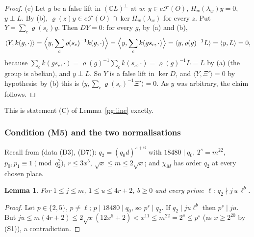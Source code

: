 \documentclass[10pt]{amsart}
\newtheorem{lemma}[theorem]{Lemma}
\theoremstyle{definition}
\theoremstyle{remark}
\newcommand{\C}{\mathbb C}
\begin{document}
\begin{proof}
(e) Let $y$ be a false lift in $(\C L)^\perp$ at $w$: $y\in e\mathcal F(O)$, $H_w(\lambda_w)y=0$,
$y\perp L$. By (b), $\varrho(z)y\in e\mathcal F(O)\cap\ker H_w(\lambda_w)$ for every $z$. Put
$Y=\sum_c\varrho(s_c)y$. Then $D Y=0$: for every $g$, by (a) and (b),
\[
\langle Y,k(g,\cdot)\rangle=\Bigl\langle y,\sum_c\varrho(s_c)^{-1}k(g,\cdot)\Bigr\rangle=
\Bigl\langle y,\sum_ck(gs_c,\cdot)\Bigr\rangle=\langle y,\varrho(g)^{-1}L\rangle=\langle y,L\rangle=0,
\]
because $\sum_ck(gs_c,\cdot)=\varrho(g)^{-1}\sum_ck(s_c,\cdot)=\varrho(g)^{-1}L=L$ by (a) (the
group is abelian), and $y\perp L$. So $Y$ is a false lift in $\ker D$, and $\langle Y,\Xi'\rangle=0$ by
hypothesis; by (b) this is $\langle y,\sum_c\varrho(s_c)^{-1}\Xi'\rangle=0$. As $y$ was arbitrary,
the claim follows.
\end{proof}

This is statement (C) of Lemma~\ref{pg:line} exactly.

\subsubsection{Condition (M5) and the two normalisations}\label{pga:ss-M}

Recall from {\cite[\S14.1]{P46}} (data (D3), (D7)): $q_2=(q_0d)^{s+6}$ with $18480\mid q_0$,
$2^s=m^{22}$, $p_0,p_1\equiv1\pmod{q_2^2}$, $r\le3x^5$, $\sqrt x\le m\le2\sqrt x$; and $\chi_M$ has
order $q_2$ at every chosen place.

\begin{lemma}\label{pga:q2}
For $1\le j\le m$, $1\le u\le4r+2$, $b\ge0$ and every prime $\ell$: $q_2\nmid j\,u\,\ell^b$.
\end{lemma}
\begin{proof}
Let $p\in\{2,5\}$, $p\ne\ell$; $p\mid18480\mid q_0$, so $p^{s}\mid q_2$. If $q_2\mid ju\ell^b$ then
$p^s\mid ju$. But $ju\le m(4r+2)\le2\sqrt x(12x^5+2)<x^{11}\le m^{22}=2^s\le p^s$ (as $x\ge2^{20}$
by (S1)), a contradiction.
\end{proof}
\end{document}
